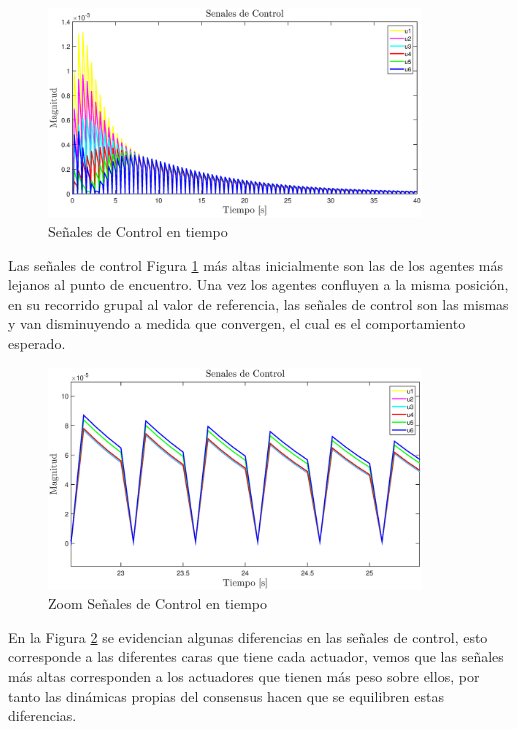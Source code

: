 \begin{figure}[!h]
	\centering
	\includegraphics[width=3.9in]{imagenes/senales_conrtrol.eps}
	\caption{Señales de Control en tiempo}
	\label{fig_senales_conrtrol}
\end{figure}

Las señales de control Figura \ref{fig_senales_conrtrol} más altas inicialmente son las de los agentes más lejanos al punto de encuentro. Una vez los agentes confluyen a la misma posición, en su recorrido grupal al valor de referencia, las señales de control son las mismas y van disminuyendo a medida que convergen, el cual es el comportamiento esperado.

\begin{figure}[!h]
	\centering
	\includegraphics[width=3.9in]{imagenes/senales_conrtrol_zoom.eps}
	\caption{Zoom Señales de Control en tiempo}
	\label{fig_senales_conrtrol_zoom}
\end{figure}
En la Figura \ref{fig_senales_conrtrol_zoom} se evidencian algunas diferencias en las señales de control, esto corresponde a las diferentes caras que tiene cada actuador, vemos que las señales más altas corresponden a los actuadores que tienen más peso sobre ellos, por tanto las dinámicas propias del consensus hacen que se equilibren estas diferencias.

